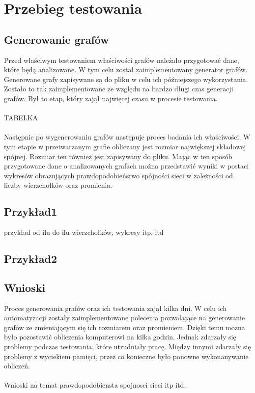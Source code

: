 
\chapter{Przebieg testowania}

	\section{Generowanie grafów}
		\label{testowanie:generacja}
		
		Przed właściwym testowaniem właściwości grafów należało przygotować dane, które będą analizowane. W tym celu został zaimplementowany generator grafów. Generowane grafy zapisywane są do pliku w celu ich późniejszego wykorzystania. Zostało to tak zaimplementowane ze względu na bardzo długi czas generacji grafów. Był to etap, który zajął najwięcej czasu w procesie testowania.\\
\\
TABELKA
\\
\\
Następnie po wygenerowaniu grafów następuje proces badania ich właściwości. W tym etapie w przetwarzanym grafie obliczany jest rozmiar największej składowej spójnej. Rozmiar ten również jest zapisywany do pliku. Mając w ten sposób przygotowane dane o analizowanych grafach można przedstawić wyniki w postaci wykresów obrazujących prawdopodobieństwo spójności sieci w zależności od liczby wierzchołków oraz promienia.
	\section{Przykład1}
		przykład od ilu do ilu wierzchołków, wykresy itp. itd

	\section{Przykład2}

	\section{Wnioski}
		Proces generowania grafów oraz ich testowania zajął kilka dni. W celu ich automatyzacji zostały zaimplementowane polecenia pozwalające na generowanie grafów ze zmieniającym się ich rozmiarem oraz promieniem. Dzięki temu można było pozostawić obliczenia komputerowi na kilka godzin. Jednak zdarzały się problemy podczas testowania, które utrudniały pracę. Między innymi zdarzały się problemy z wyciekiem pamięci, przez co konieczne było ponowne wykonanywanie obliczeń.\\
	\\
	Wnioski na temat prawdopodobiensta spojnosci sieci itp itd.
